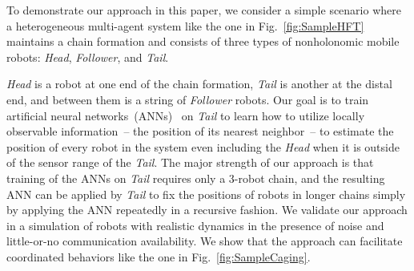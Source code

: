 \documentclass[letterpaper, 10 pt, conference]{ieeeconf}  %
\begin{document}
	To demonstrate our approach in this paper, we consider a simple scenario
	where a heterogeneous multi-agent system like the one in
	Fig.~\ref{fig:SampleHFT} maintains a chain
	formation and consists of three types of nonholonomic mobile robots:
	\emph{Head}, \emph{Follower}, and \emph{Tail}.
	
	\emph{Head} is a robot at one end of the chain formation, \emph{Tail} is
	another at the distal end, and between them is a string of
	\emph{Follower} robots. Our goal is to train artificial neural
	networks~(ANNs)~\cite{Schmidhuber15} on \emph{Tail} to learn how to
	utilize locally observable information~-- the position of its nearest
	neighbor~-- to estimate the position of every robot in the system even
	including the \emph{Head} when it is outside of the sensor range of the
	\emph{Tail}. The major strength of our approach is that training of the
	ANNs on \emph{Tail} requires only a 3-robot chain, and the resulting ANN
	can be applied by \emph{Tail} to fix the positions of robots in longer
	chains simply by applying the ANN repeatedly in a recursive fashion. We
	validate our approach in a simulation of robots with realistic dynamics
	in the presence of noise and little-or-no communication availability. We
	show that the approach can facilitate coordinated behaviors like the
	one in Fig.~\ref{fig:SampleCaging}.
	
	
\end{document}
